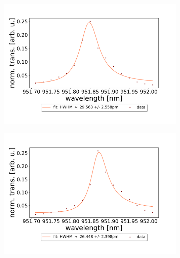 \begin{figure}[h!]
\begin{subfigure}[b]{0.49\textwidth}
        \includegraphics[width=\textwidth]{figures/results/double fano fits/1000um_M3:M5_fit_3.pdf}
        \caption{}
        \label{fig:1000um_M3:M5_fit_3}
    \end{subfigure}
    \begin{subfigure}[b]{0.49\textwidth}
        \includegraphics[width=\textwidth]{figures/results/double fano fits/1000um_M3:M5_fit_4.pdf}
        \caption{}
        \label{fig:1000um_M3:M5_fit_4}
    \end{subfigure}
    \begin{subfigure}[b]{0.49\textwidth}

\end{subfigure}
\end{figure}
